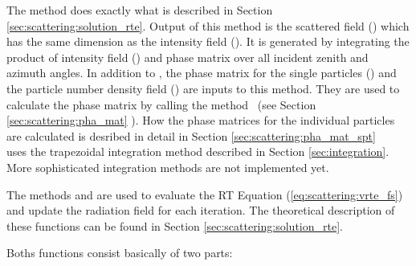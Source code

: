 \label{sec:scattering:sca_fieldCalc}
The method  does exactly what is described
in Section \ref{sec:scattering:solution_rte}.  Output of this method
is the scattered field () which has the same
dimension as the intensity field ().  It is
generated by integrating the product of intensity field
() and phase matrix  over all
incident zenith and azimuth angles.  In addition to
, the phase matrix for the single particles
() and the particle number density field
() are inputs to this method.  They are used to
calculate the phase matrix  by calling the method
\ (see Section
\ref{sec:scattering:pha_mat} ). How the phase matrices for the individual particles are calculated is desribed in detail in Section \ref{sec:scattering:pha_mat_spt} \\
 uses the trapezoidal integration method
described in Section \ref{sec:integration}. More sophisticated
integration methods are not implemented yet.


\label{sec:scattering:RT_methods}

The methods  and
 are used to evaluate the RT Equation
(\ref{eq:scattering:vrte_fs}) and update the radiation field
 for each iteration. The theoretical description of
these functions can be found in Section
\ref{sec:scattering:solution_rte}.

Boths functions consist basically of two parts:

